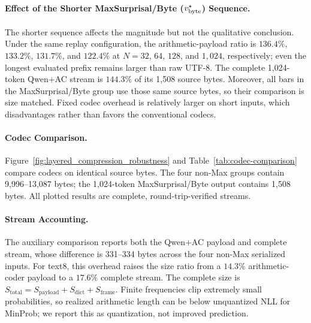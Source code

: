 \paragraph{Effect of the Shorter MaxSurprisal/Byte ($v^\star_{\mathrm{byte}}$) Sequence.}
\label{app:maxsurprisal-length}
The shorter sequence affects the magnitude but not the qualitative conclusion.
Under the same replay configuration, the arithmetic-payload ratio is $136.4\%$,
$133.2\%$, $131.7\%$, and $122.4\%$ at $N=32$, $64$, $128$, and $1{,}024$,
respectively; even the longest evaluated prefix remains larger than raw UTF-8.
The complete 1,024-token Qwen+AC stream is $144.3\%$ of its 1,508 source bytes.
Moreover, all bars in the MaxSurprisal/Byte group use those same source bytes,
so their comparison is size matched. Fixed codec overhead is relatively larger
on short inputs, which disadvantages rather than favors the conventional codecs.

\paragraph{Codec Comparison.}
Figure~\ref{fig:layered_compression_robustness} and
Table~\ref{tab:codec-comparison} compare codecs on identical source bytes. The
four non-Max groups contain 9,996--13,087 bytes; the 1,024-token
MaxSurprisal/Byte output contains 1,508 bytes. All plotted results are complete, round-trip-verified streams.

\paragraph{Stream Accounting.}
\label{app:stream-accounting}
The auxiliary comparison reports both the Qwen+AC payload and complete stream,
whose difference is 331--334 bytes across the four non-Max serialized inputs.
For text8, this overhead raises the size ratio from a $14.3\%$ arithmetic-coder
payload to a $17.6\%$ complete stream. The
complete size is $S_{\mathrm{total}}=S_{\mathrm{payload}}+S_{\mathrm{dict}}+
S_{\mathrm{frame}}$. Finite frequencies clip extremely small probabilities, so
realized arithmetic length can be below unquantized NLL for MinProb; we report
this as quantization, not improved prediction.

